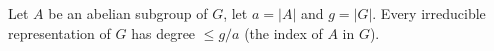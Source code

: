 Let $A$ be an abelian subgroup of $G$, let $a = |A|$ and $g = |G|$. Every irreducible representation of $G$ has degree $\leq g/a$ (the index of $A$ in $G$).
